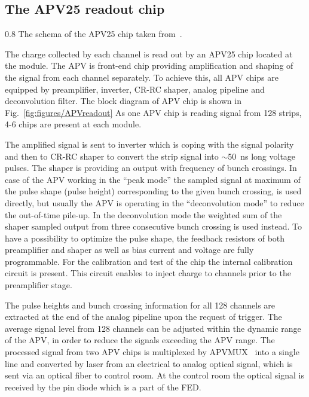 

\subsection{The APV25 readout chip \label{sec:APV}}


                 {0.8}       %
                 {The schema of the APV25 chip taken from~\cite{Friedl:2001kra}.} %

The charge collected by each channel is read out by an APV25 chip located at the module. The APV is front-end chip providing amplification and shaping of the signal from each channel separately. To achieve this, all APV chips are equipped by preamplifier, inverter, CR-RC shaper, analog pipeline and deconvolution filter. The block diagram of APV chip is shown in Fig.~\ref{fig:figures/APVreadout} As one APV chip is reading signal from 128 strips, 4-6 chips are present at each module.

The amplified signal is sent to inverter which is coping with the signal polarity and then to CR-RC shaper to convert the strip signal into $\sim$50~ns long voltage pulses. The shaper is providing an output with frequency of bunch crossings. In case of the APV working in the ``peak mode'' the sampled signal at maximum of the pulse shape (pulse height) corresponding to the given bunch crossing, is used directly, but usually the APV is operating in the ``deconvolution mode'' to reduce the out-of-time pile-up. In the deconvolution mode the weighted sum of the shaper sampled output from three consecutive bunch crossing is used instead. To have a possibility to optimize the pulse shape, the feedback resistors of both preamplifier and shaper as well as  bias current and voltage are fully programmable. For the calibration and test of the chip the internal calibration circuit is present. This circuit enables to inject charge to channels prior to the preamplifier stage.

The pulse heights and bunch crossing information for all 128 channels are extracted at the end of the analog pipeline upon the request of trigger. The average signal level from 128 channels can be adjusted within the dynamic range of the APV, in order to reduce the signals exceeding the APV range. The processed signal from two APV chips is multiplexed by APVMUX~\cite{Ball:2007zza} into a single line and converted by laser from an electrical to analog optical signal, which is sent via an optical fiber to control room. At the control room the optical signal is received by the pin diode which is a part of the FED.

